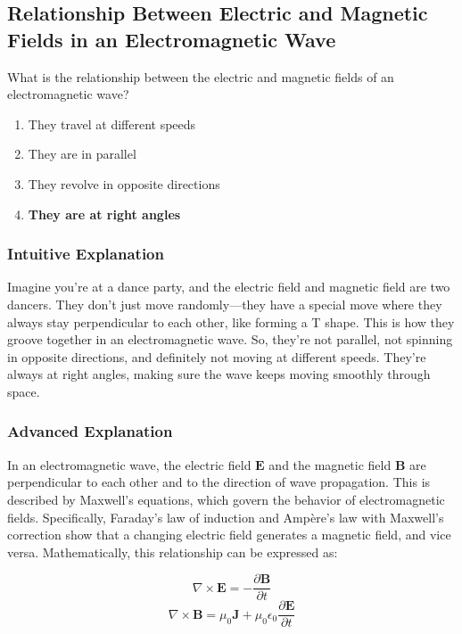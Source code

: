 \subsection{Relationship Between Electric and Magnetic Fields in an Electromagnetic Wave}
\label{T3B01}

\begin{tcolorbox}[colback=gray!10!white,colframe=black!75!black,title=T3B01]
What is the relationship between the electric and magnetic fields of an electromagnetic wave?
\begin{enumerate}[label=\Alph*)]
    \item They travel at different speeds
    \item They are in parallel
    \item They revolve in opposite directions
    \item \textbf{They are at right angles}
\end{enumerate}
\end{tcolorbox}

\subsubsection{Intuitive Explanation}
Imagine you’re at a dance party, and the electric field and magnetic field are two dancers. They don’t just move randomly—they have a special move where they always stay perpendicular to each other, like forming a T shape. This is how they groove together in an electromagnetic wave. So, they’re not parallel, not spinning in opposite directions, and definitely not moving at different speeds. They’re always at right angles, making sure the wave keeps moving smoothly through space.

\subsubsection{Advanced Explanation}
In an electromagnetic wave, the electric field \(\mathbf{E}\) and the magnetic field \(\mathbf{B}\) are perpendicular to each other and to the direction of wave propagation. This is described by Maxwell's equations, which govern the behavior of electromagnetic fields. Specifically, Faraday's law of induction and Ampère's law with Maxwell's correction show that a changing electric field generates a magnetic field, and vice versa. Mathematically, this relationship can be expressed as:

\[
\nabla \times \mathbf{E} = -\frac{\partial \mathbf{B}}{\partial t}
\]
\[
\nabla \times \mathbf{B} = \mu_0 \mathbf{J} + \mu_0 \epsilon_0 \frac{\partial \mathbf{E}}{\partial t}
\]

